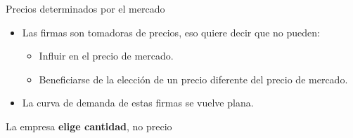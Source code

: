 \documentclass{beamer}
\begin{document}
\begin{frame}{Precios determinados por el mercado}
    \begin{itemize}
        \item Las firmas son tomadoras de precios, eso quiere decir que no pueden:
        \begin{itemize}
            \item Influir en el precio de mercado.
            \item Beneficiarse de la elección de un precio diferente del precio de mercado.
        \end{itemize}
        \item La curva de demanda de estas firmas se vuelve plana.
        \end{itemize}
        \begin{boxB}
            \centering
            La empresa \textbf{elige cantidad}, no precio
        \end{boxB}
\begin{center}
\begin{figure}[h!]
\renewcommand{\figurename}{Figure}
\begin{center}
    \begin{minipage}[b]{0.45\textwidth}
        \begin{center}
\end{center}
     \end{minipage}
    \begin{minipage}[b]{0.45\textwidth}
    \begin{center}
\end{center}
    \end{minipage}
\end{center}
\end{figure}
\end{center} 
\end{frame}
\end{document}
